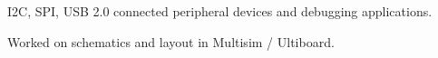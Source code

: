 \documentclass[]{bergman-cv} %
\begin{document}
\begin{entrylist}
{\begin{itemizenosep}
	\item I2C, SPI, USB 2.0 connected peripheral devices and debugging applications.
	\item Worked on schematics and layout in Multisim / Ultiboard.
\end{itemizenosep}}
\end{entrylist}
\end{document}
